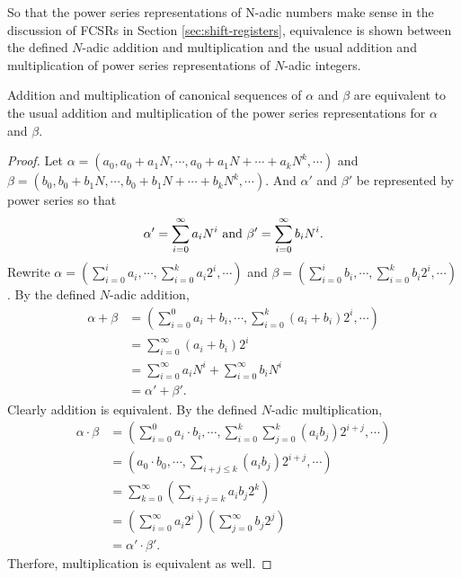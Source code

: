 \par So that the power series representations of N-adic numbers make sense in
the discussion of FCSRs in Section \ref{sec:shift-registers}, equivalence is
shown between the defined $N$-adic addition and multiplication and the usual
addition and multiplication of power series representations of $N$-adic
integers.

\begin{lemma}
	Addition and multiplication of canonical sequences of $\alpha$ and $\beta$ are
	equivalent to the usual addition and multiplication of the power series
	representations for $\alpha$ and $\beta$.
\end{lemma}
\begin{proof}
	Let $\alpha=(a_0,a_0+a_1N,\cdots,a_0+a_1N+\cdots+a_kN^k,\cdots)$
	and $\beta=(b_0,b_0+b_1N,\cdots,b_0+b_1N+\cdots+b_kN^k,\cdots)$. And $\alpha'$
	and $\beta'$ be represented by power series so that
	\[
		\alpha'=\sum_{i=0}^\infty a_iN^i{\rm \ and\ } \beta'=\sum_{i=0}^\infty b_iN^i.
	\]
	Rewrite $\alpha=(\sum_{i=0}^ia_i,\cdots,\sum_{i=0}^ka_i2^i,\cdots)$ and
	$\beta=(\sum_{i=0}^ib_i,\cdots,\sum_{i=0}^kb_i2^i,\cdots)$. By the defined
	$N$-adic addition,
	\begin{align*}
		\alpha+\beta&=(\sum_{i=0}^0a_i+b_i,\cdots,\sum_{i=0}^k(a_i+b_i)2^i,\cdots)\\
		            &=\sum_{i=0}^\infty(a_i+b_i)2^i\\
								&=\sum_{i=0}^\infty a_iN^i + \sum_{i=0}^\infty b_iN^i\\
								&=\alpha'+\beta'.
  \end{align*}
	Clearly addition is equivalent. By the defined $N$-adic multiplication,
	\begin{align*}
		\alpha\cdot\beta&=(\sum_{i=0}^0a_i\cdot b_i,\cdots,\sum_{i=0}^k\sum_{j=0}^k(a_ib_j)2^{i+j},\cdots)\\
		                &=(a_0\cdot b_0,\cdots,\sum_{i+j\leq k}(a_ib_j)2^{i+j},\cdots)\\
										&=\sum_{k=0}^\infty\left(\sum_{i+j=k}a_ib_j2^k\right)\\
										&=\left(\sum_{i=0}^\infty a_i2^i\right)\left(\sum_{j=0}^\infty b_j2^j\right)\\
										&=\alpha'\cdot\beta'.
	\end{align*}
	Therfore, multiplication is equivalent as well.
\end{proof}

